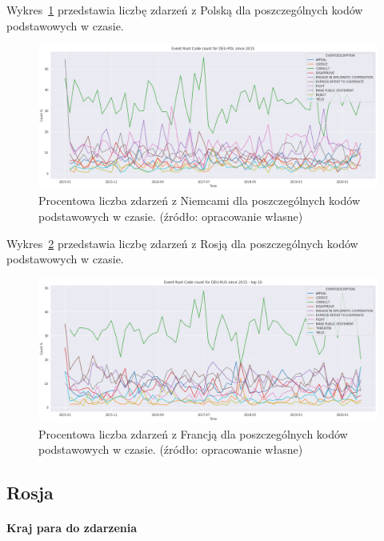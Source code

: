 \documentclass[11pt]{report}
\begin{document}
    Wykres~\ref{fig:DEUPOLERC} przedstawia liczbę zdarzeń z Polską dla poszczególnych kodów podstawowych w czasie.
    \begin{figure}[!htp]
        \centering
        \includegraphics[width=\linewidth]{fig/DEU/DEUPOLERCperc.png}
        \caption{Procentowa liczba zdarzeń z Niemcami dla poszczególnych kodów podstawowych w czasie. (źródło: opracowanie własne)}
        \label{fig:DEUPOLERC}
    \end{figure}

    Wykres~\ref{fig:DEURUSERC} przedstawia liczbę zdarzeń z Rosją dla poszczególnych kodów podstawowych w czasie.
    \begin{figure}[!htp]
        \centering
        \includegraphics[width=\linewidth]{fig/DEU/DEURUSERCperc.png}
        \caption{Procentowa liczba zdarzeń z Francją dla poszczególnych kodów podstawowych w czasie. (źródło: opracowanie własne)}
        \label{fig:DEURUSERC}
    \end{figure}

    \subsection{Rosja}

    \paragraph{Kraj para do zdarzenia}
\end{document}

